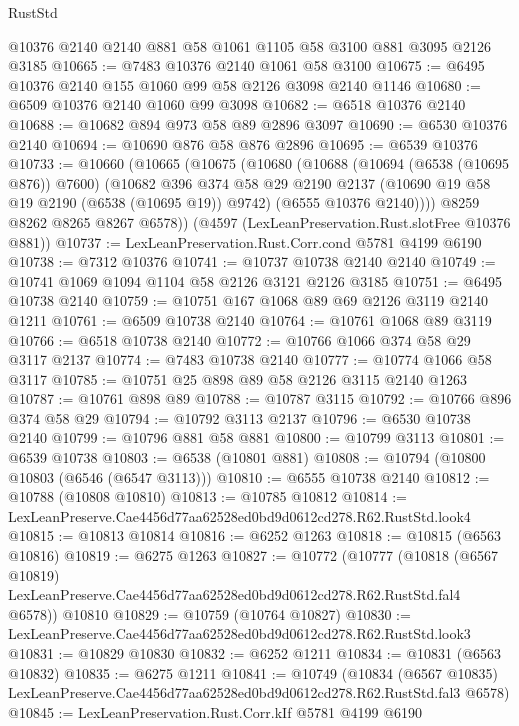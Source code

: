 \begin{lexlean}{RustStd}
\begin{coremodule}
    @10376
    @2140
    @2140
    @881
    @58
    @1061
    @1105
    @58
    @3100
    @881
    @3095
    @2126
    @3185
@10665 := @7483 @10376 @2140 @1061 @58 @3100
@10675 := @6495 @10376 @2140 @155 @1060 @99 @58 @2126 @3098 @2140 @1146
@10680 := @6509 @10376 @2140 @1060 @99 @3098
@10682 := @6518 @10376 @2140
@10688 := @10682 @894 @973 @58 @89 @2896 @3097
@10690 := @6530 @10376 @2140
@10694 := @10690 @876 @58 @876 @2896
@10695 := @6539 @10376
@10733 := @10660
    (@10665
      (@10675
        (@10680
          (@10688
            (@10694 (@6538 (@10695 @876)) @7600)
            (@10682
              @396
              @374
              @58
              @29
              @2190
              @2137
              (@10690 @19 @58 @19 @2190 (@6538 (@10695 @19)) @9742)
              (@6555 @10376 @2140))))
        @8259
        @8262
        @8265
        @8267
        @6578))
    (@4597 (LexLeanPreservation.Rust.slotFree @10376 @881))
@10737 := LexLeanPreservation.Rust.Corr.cond @5781 @4199 @6190
@10738 := @7312 @10376
@10741 := @10737 @10738 @2140 @2140
@10749 := @10741 @1069 @1094 @1104 @58 @2126 @3121 @2126 @3185
@10751 := @6495 @10738 @2140
@10759 := @10751 @167 @1068 @89 @69 @2126 @3119 @2140 @1211
@10761 := @6509 @10738 @2140
@10764 := @10761 @1068 @89 @3119
@10766 := @6518 @10738 @2140
@10772 := @10766 @1066 @374 @58 @29 @3117 @2137
@10774 := @7483 @10738 @2140
@10777 := @10774 @1066 @58 @3117
@10785 := @10751 @25 @898 @89 @58 @2126 @3115 @2140 @1263
@10787 := @10761 @898 @89
@10788 := @10787 @3115
@10792 := @10766 @896 @374 @58 @29
@10794 := @10792 @3113 @2137
@10796 := @6530 @10738 @2140
@10799 := @10796 @881 @58 @881
@10800 := @10799 @3113
@10801 := @6539 @10738
@10803 := @6538 (@10801 @881)
@10808 := @10794 (@10800 @10803 (@6546 (@6547 @3113)))
@10810 := @6555 @10738 @2140
@10812 := @10788 (@10808 @10810)
@10813 := @10785 @10812
@10814 := LexLeanPreserve.Cae4456d77aa62528ed0bd9d0612cd278.R62.RustStd.look4
@10815 := @10813 @10814
@10816 := @6252 @1263
@10818 := @10815 (@6563 @10816)
@10819 := @6275 @1263
@10827 := @10772
    (@10777
      (@10818
        (@6567 @10819)
        LexLeanPreserve.Cae4456d77aa62528ed0bd9d0612cd278.R62.RustStd.fal4
        @6578))
    @10810
@10829 := @10759 (@10764 @10827)
@10830 := LexLeanPreserve.Cae4456d77aa62528ed0bd9d0612cd278.R62.RustStd.look3
@10831 := @10829 @10830
@10832 := @6252 @1211
@10834 := @10831 (@6563 @10832)
@10835 := @6275 @1211
@10841 := @10749
    (@10834 (@6567 @10835) LexLeanPreserve.Cae4456d77aa62528ed0bd9d0612cd278.R62.RustStd.fal3 @6578)
@10845 := LexLeanPreservation.Rust.Corr.kIf @5781 @4199 @6190

\end{coremodule}
\end{lexlean}
